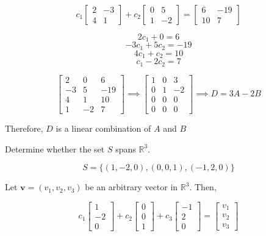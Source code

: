 \documentclass{report}
\begin{document}
\newpage

$$
c_1 \begin{bmatrix} 2 & -3 \\ 4 & 1 \end{bmatrix} + c_2 \begin{bmatrix} 0 & 5 \\ 1 & -2 \end{bmatrix} = \begin{bmatrix} 6 & -19 \\ 10 & 7 \end{bmatrix}
$$

$$2 c_1 + 0 = 6$$ $$ -3c_1 + 5c_2 = -19 $$ $$ 4c_1 + c_2 = 10 $$ $$c_1 -2c_2 = 7$$

$$
\begin{bmatrix} 2 & 0 & 6 \\ -3 & 5 & -19 \\ 4 & 1 & 10 \\ 1 & -2 & 7 \end{bmatrix} \implies \begin{bmatrix} 1 & 0 & 3 \\ 0 & 1 & -2 \\ 0 & 0 & 0 \\ 0 & 0 & 0 \end{bmatrix} \implies D = 3A - 2B
$$

Therefore, $D$ is a linear combination of $A$ and $B$

\begin{tcolorbox}[colframe = lightred]
	Determine whether the set $S$ spans $\mathbb{R}^3$.
	
	$$
	S = \{(1,-2,0),(0,0,1),(-1,2,0)\}
	$$
	
\end{tcolorbox}

Let $\bm{v} = (v_1,v_2,v_3)$ be an arbitrary vector in $\mathbb{R}^3$. Then,

$$	
c_1 \begin{bmatrix} 1 \\ -2 \\ 0 \end{bmatrix} + c_2 \begin{bmatrix} 0 \\ 0 \\ 1 \end{bmatrix} + c_3 \begin{bmatrix} -1 \\ 2 \\ 0 \end{bmatrix} = \begin{bmatrix} v_1 \\ v_2 \\ v_3 \end{bmatrix}
$$
\end{document}
